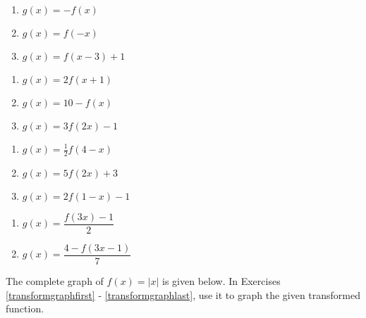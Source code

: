 \begin{multicols}{3}
\begin{enumerate}
\setcounter{enumi}{\value{HW}}

\item $g(x) = -f(x)$
\item $g(x) = f(-x)$
\item $g(x) = f(x-3)+1$

\setcounter{HW}{\value{enumi}}
\end{enumerate}
\end{multicols}

\begin{multicols}{3}
\begin{enumerate}
\setcounter{enumi}{\value{HW}}

\item $g(x) = 2f(x+1)$
\item $g(x) = 10 - f(x)$
\item $g(x) = 3f(2x) - 1$

\setcounter{HW}{\value{enumi}}
\end{enumerate}
\end{multicols}

\begin{multicols}{3}
\begin{enumerate}
\setcounter{enumi}{\value{HW}}

\item $g(x) = \frac{1}{2} f(4-x)$
\item \mbox{$g(x) = 5f(2x)+3$}
\item \mbox{$g(x) = 2f(1-x) -1$}

\setcounter{HW}{\value{enumi}}
\end{enumerate}
\end{multicols}

\begin{multicols}{2}
\begin{enumerate}
\setcounter{enumi}{\value{HW}}

\item $g(x) = \dfrac{f(3x) - 1}{2}$
\item $g(x) = \dfrac{4-f(3x-1)}{7}$ \label{transformpointlast}

\setcounter{HW}{\value{enumi}}
\end{enumerate}
\end{multicols}

The complete graph of $f(x)=|x|$ is given below.  In Exercises \ref{transformgraphfirst} - \ref{transformgraphlast}, use it %
to graph the given transformed function.

